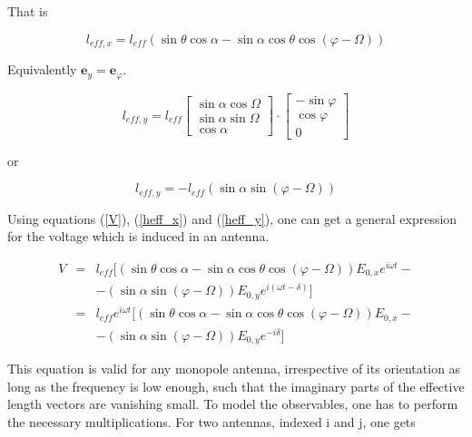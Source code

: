 \documentclass[a4paper,11pt]{report}
\begin{document}
That is

\begin{equation}
{l}_{eff,x} = l_{eff}( \sin \theta \cos \alpha - \sin \alpha \cos\theta\cos (\varphi - \Omega ) )\label{heff_x}
\end{equation}

Equivalently $\textbf{e}_y=\textbf{e}_\varphi$.

\begin{equation}
{l}_{eff,y} = l_{eff} \left[ \begin{array}{c}
\sin \alpha \cos \Omega\\
\sin \alpha \sin \Omega\\
\cos \alpha
\end{array}  \right] \cdot \left[ \begin{array}{c}
-\sin \varphi\\
\cos \varphi\\
0
\end{array}  \right]
\end{equation}

or

\begin{equation}
{l}_{eff,y} = -l_{eff}( \sin \alpha \sin (\varphi - \Omega ) )\label{heff_y}
\end{equation}


Using equations (\ref{V}), (\ref{heff_x}) and (\ref{heff_y}), one can get a general expression for the voltage which is induced in an antenna.

\begin{eqnarray}
V & = & l_{eff} [ (\sin \theta \cos \alpha - \sin \alpha \cos \theta \cos (\varphi - \Omega) )E_{0,x}e^{i \omega t} - \nonumber \\
& & -(\sin \alpha \sin (\varphi - \Omega))E_{0,y}e^{i (\omega t-\delta) } ] \nonumber \\
& = & l_{eff} e^{i \omega t} [ (\sin \theta \cos \alpha - \sin \alpha \cos \theta \cos (\varphi - \Omega) )E_{0,x} - \\
& & -(\sin \alpha \sin (\varphi - \Omega))E_{0,y}e^{-i \delta } ] \nonumber
\end{eqnarray}


This equation is valid for any monopole antenna, irrespective of its orientation as long as the frequency is low enough, such that the imaginary parts of the effective length vectors are vanishing small. To model the observables, one has to perform the necessary multiplications. For two antennas, indexed i and j, one gets
\end{document}
